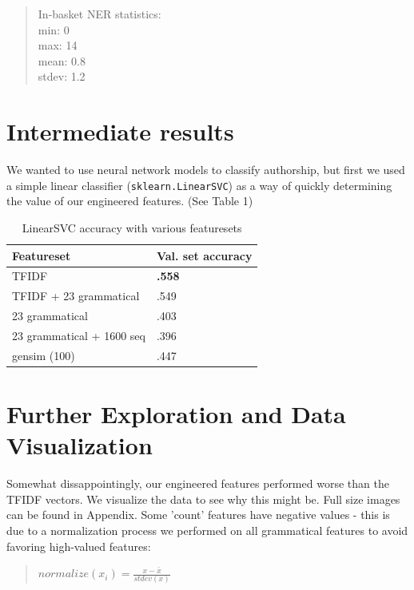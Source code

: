 \documentclass[12pt]{article}
\begin{document}
\begin{quote}
In-basket NER statistics:\\
min: 0 \\
max: 14 \\
mean: 0.8 \\
stdev: 1.2\\
\end{quote}


\section{Intermediate results}
We wanted to use neural network models to classify authorship, but first we used a simple linear classifier (\texttt{sklearn.LinearSVC}) as a way of quickly determining the value of our engineered features. (See Table 1)
\vskip 0.2in
\begin{table}[h]
  \centering
  \begin{tabular}{|l|l|}
    \hline
    Featureset  & Val. set accuracy \\
    \hline
    TFIDF      & \textbf{.558} \\
    TFIDF + 23 grammatical      & .549 \\ 
    23 grammatical      & .403 \\    
    23 grammatical + 1600 seq     & .396 \\  
    gensim (100)      & .447 \\  
    \hline
  \end{tabular}
  \caption{LinearSVC accuracy with various featuresets}
  \label{tab:sparseresults}
\end{table}

\section{Further Exploration and Data Visualization}
Somewhat dissappointingly, our engineered features performed worse than the TFIDF vectors. We visualize the data to see why this might be. Full size images can be found in Appendix. Some 'count' features have negative values - this is due to a normalization process we performed on all grammatical features to avoid favoring high-valued features:

\begin{quote}
$ normalize(x_i) = \frac{x - \bar{x}}{stdev(x)} $
\end{quote}
\end{document}
